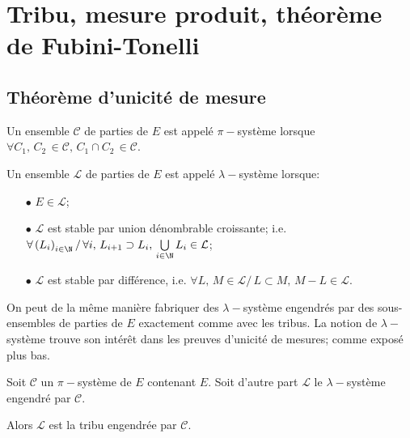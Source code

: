 

\section{Tribu, mesure produit, théorème de Fubini-Tonelli}


\subsection{Théorème d'unicité de mesure}

\begin{de}[$\pi-$système]
Un ensemble $\mathcal{C}$ de parties de $E$ est appelé $\pi-$système lorsque $\forall C_1, \, C_2 \, \in \mathcal{C}, \, C_1 \cap C_2 \, \in \mathcal{C}$.
\end{de}

\begin{de}
Un ensemble $\mathcal{L}$ de parties de $E$ est appelé $\lambda-$système lorsque:
\begin{itemize}
\item[$\bullet$] $E \in \mathcal{L}$;
\item[$\bullet$] $\mathcal{L}$ est stable par union dénombrable croissante; i.e. $\forall \left(L_i\right)_{i \in \N} / \, \forall i, \, L_{i+1} \supset L_i, \, \bigcup \limits_{i \in \N} L_i \in \mathcal{L}$;
\item[$\bullet$] $\mathcal{L}$ est stable par différence, i.e. $\forall L, \, M \in \mathcal{L}/ \, L \subset M, \, M-L \in \mathcal{L}$.
\end{itemize}
\end{de}

On peut de la même manière fabriquer des $\lambda-$système engendrés par des sous-ensembles de parties de $E$ exactement comme avec les tribus. La notion de $\lambda-$système trouve son intérêt dans les preuves d'unicité de mesures; comme exposé plus bas.

\begin{prop}
Soit $\mathcal{C}$ un $\pi-$système de $E$ contenant $E$. Soit d'autre part $\mathcal{L}$ le $\lambda-$système engendré par $\mathcal{C}$.

Alors $\mathcal{L}$ est la tribu engendrée par $\mathcal{C}$.
\end{prop}

